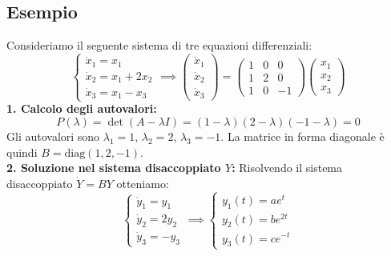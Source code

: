 \documentclass[openany]{book}
\theoremstyle{definition}
\theoremstyle{remark}
\begin{document}
\subsection*{Esempio}
Consideriamo il seguente sistema di tre equazioni differenziali:
\begin{equation}
    \begin{cases}
        \dot{x}_1 = x_1 \\
        \dot{x}_2 = x_1 + 2x_2 \\
        \dot{x}_3 = x_1 - x_3
    \end{cases}
    \implies
    \begin{pmatrix} \dot{x}_1 \\ \dot{x}_2 \\ \dot{x}_3 \end{pmatrix}
    =
    \begin{pmatrix} 
        1 & 0 & 0 \\ 
        1 & 2 & 0 \\ 
        1 & 0 & -1 
    \end{pmatrix}
    \begin{pmatrix} x_1 \\ x_2 \\ x_3 \end{pmatrix}
\end{equation}
\textbf{1. Calcolo degli autovalori:}
\begin{equation}
    P(\lambda) = \det(A - \lambda I) = (1-\lambda)(2-\lambda)(-1-\lambda) = 0
\end{equation}
Gli autovalori sono $\lambda_1 = 1$, $\lambda_2 = 2$, $\lambda_3 = -1$. La matrice in forma diagonale è quindi $B = \text{diag}(1, 2, -1)$.
\\
\textbf{2. Soluzione nel sistema disaccoppiato $Y$:}
Risolvendo il sistema disaccoppiato $\dot{Y} = BY$ otteniamo:
\begin{equation}
    \begin{cases}
        \dot{y}_1 = y_1 \\
        \dot{y}_2 = 2y_2 \\
        \dot{y}_3 = -y_3
    \end{cases}
    \implies
    \begin{cases}
        y_1(t) = a e^{t} \\
        y_2(t) = b e^{2t} \\
        y_3(t) = c e^{-t}
    \end{cases}
\end{equation}
\\
\end{document}
